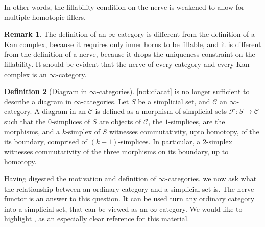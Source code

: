 \documentclass[10pt]{amsart}
\makeatletter
\newcommand{\8}{\ensuremath{\infty}}
\newcommand{\0}{\ensuremath{\overset{\rightarrow}{0}}}
\newcommand{\1}{\ensuremath{\mathbf{1}}}
\newcommand{\C}{\ensuremath{\mathscr{C}}}
\newcommand{\F}{\ensuremath{\mathscr{F}}}
\theoremstyle{definition}
\newtheorem{definition}{Definition}[section]
\newtheorem{remark}[definition]{Remark}
\def\subsection{\@startsection{subsection}{2}
  \z@{.5\linespacing\@plus.7\linespacing}{.6\baselineskip}{\centering}}
\numberwithin{definition}{subsection}
\numberwithin{definition}{section}
\makeatother
\begin{document}
In other words, the fillability condition on the nerve is weakened to allow for multiple homotopic fillers.

\begin{remark}
  The definition of an \8-category is different from the definition of a Kan complex, because it requires only inner horns to be fillable, and it is different from the definition of a nerve, because it drops the uniqueness constraint on the fillability. It should be evident that the nerve of every category and every Kan complex is an \8-category.
\end{remark}

\begin{definition}[Diagram in \8-categories]
  \ref{not:diacat} is no longer sufficient to describe a diagram in \8-categories. Let $S$ be a simplicial set, and $\C$ an \8-category. A diagram in an $\C$ is defined as a morphism of simplicial sets $\F : S \rightarrow \C$ such that the $0$-simplices of $S$ are objects of \C, the $1$-simplices, are the morphisms, and a $k$-simplex of $S$ witnesses commutativity, upto homotopy, of the its boundary, comprised of $(k - 1)$-simplices. In particular, a $2$-simplex witnesses commutativity of the three morphisms on its boundary, up to homotopy.
\end{definition}

\subsection{Nerve}
Having digested the motivation and definition of \8-categories, we now ask what the relationship between an ordinary category and a simplicial set is. The nerve functor is an answer to this question. It can be used turn any ordinary category into a simplicial set, that can be viewed as an \8-category. We would like to highlight \cite{Cisinki19}, as an especially clear reference for this material.
\end{document}
